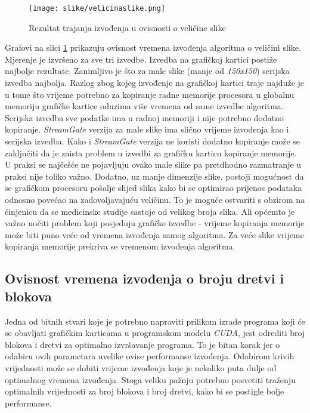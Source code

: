 \documentclass[times, utf8, zavrsni, numeric, sort]{fer}
\begin{document}
\begin{figure}[htb]
\centering
\texttt{[image: slike/velicinaslike.png]}
\caption{Rezultat trajanja izvođenja u ovisnosti o veličine slike}
\label{fig:vrijeme_velicina}
\end{figure}


Grafovi na slici \ref{fig:vrijeme_velicina} prikazuju ovisnost vremena izvođenja algoritma o veličini slike. Mjerenje je izvršeno za sve tri izvedbe. Izvedba na grafičkoj kartici postiže najbolje rezultate. Zanimljivo je što za male slike (manje od \emph{150x150}) serijska izvedba najbolja. Razlog zbog kojeg izvođenje na grafičkoj kartici traje najduže je u tome što vrijeme potrebno za kopiranje radne memorije procesora u globalnu memoriju grafičke kartice oduzima više vremena od same izvedbe algoritma. Serijska izvedba sve podatke ima u radnoj memoriji i nije potrebno dodatno kopiranje. \emph{StreamGate} verzija za male slike ima slično vrijeme izvođenja kao i serijska izvedba. Kako i \emph{StreamGate} verzija ne koristi dodatno kopiranje može se zaključiti da je zaista problem u izvedbi za grafičku karticu kopiranje memorije. U praksi se najčešće ne pojavljuju ovako male slike pa pretdhodno razmatranje u praksi nije toliko važno. Dodatno, uz manje dimenzije slike, postoji mogućnost da se grafičkom procesoru pošalje slijed slika kako bi se optimirao prijenos podataka odnosno povećao na zadovoljavajuću veličinu. To je moguće ostvariti s obzirom na činjenicu da se medicinske studije sastoje od velikog broja slika. Ali općenito je važno uočiti problem koji posjeduju grafičke izvedbe - vrijeme kopiranja memorije može biti puno veće od vremena izvođenja samog algoritma. Za veće slike vrijeme kopiranja memorije prekriva se vremenom izvođenja algoritma.

\subsection{Ovisnost vremena izvođenja o broju dretvi i blokova}

Jedna od bitnih stvari koje je potrebno napraviti prilikom izrade programa koji će se obavljati grafičkim karticama u programskom modelu \emph{CUDA}, jest odrediti broj blokova i dretvi za optimalno izvršavanje programa. To je bitan korak jer o odabiru ovih parametara uvelike ovise performanse izvođenja. Odabirom krivih vrijednosti može se dobiti vrijeme izvođenja koje je nekoliko puta dulje od optimalnog vremena izvođenja. Stoga veliku pažnju potrebno posvetiti traženju optimalnih vrijednosti za broj blokova i broj dretvi, kako bi se postigle bolje performanse.
\end{document}

